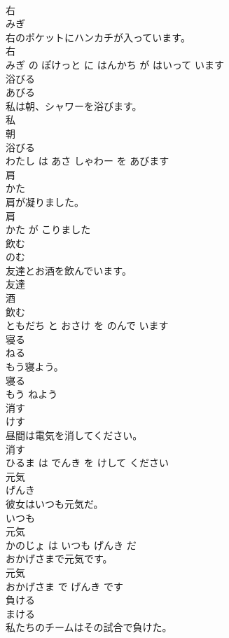 \documentclass[8pt]{extreport}
\begin{document}
\begin{CJK}{UTF8}{min}
\\	右	
\\	みぎ			
\\	右のポケットにハンカチが入っています。	
\\	右 
\\	みぎ の ぽけっと に はんかち が はいって います			
\\	浴びる	
\\	あびる			
\\	私は朝、シャワーを浴びます。	
\\	私 
\\	朝 
\\	浴びる 
\\	わたし は あさ しゃわー を あびます			
\\	肩	
\\	かた			
\\	肩が凝りました。	
\\	肩 
\\	かた が こりました			
\\	飲む	
\\	のむ			
\\	友達とお酒を飲んでいます。	
\\	友達 
\\	酒 
\\	飲む 
\\	ともだち と おさけ を のんで います			
\\	寝る	
\\	ねる			
\\	もう寝よう。	
\\	寝る 
\\	もう ねよう			
\\	消す	
\\	けす			
\\	昼間は電気を消してください。	
\\	消す 
\\	ひるま は でんき を けして ください			
\\	元気	
\\	げんき			
\\	彼女はいつも元気だ。	
\\	いつも 
\\	元気 
\\	かのじょ は いつも げんき だ			
\\	おかげさまで元気です。	
\\	元気 
\\	おかげさま で げんき です			
\\	負ける	
\\	まける			
\\	私たちのチームはその試合で負けた。	

\end{CJK}
\end{document}
